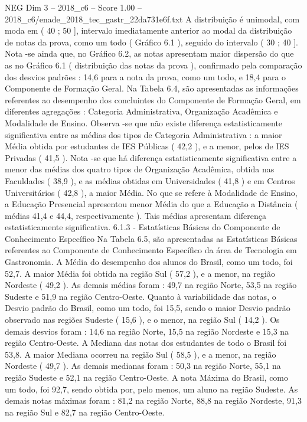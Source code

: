 \begin{textsample}{NEG Dim 3 – 2018\_c6 – Score 1.00 – 2018\_c6/enade\_2018\_tec\_gastr\_22da731e6f.txt}
A distribuição é unimodal, com moda em ( 40 ; 50 ], intervalo imediatamente anterior ao modal da distribuição de notas da prova, como um todo ( Gráfico 6.1 ), seguido do intervalo ( 30 ; 40 ].
Nota -se ainda que, no Gráfico 6.2, as notas apresentam maior dispersão do que as no Gráfico 6.1 ( distribuição das notas da prova ), confirmado pela comparação dos desvios padrões : 14,6 para a nota da prova, como um todo, e 18,4 para o Componente de Formação Geral.
Na Tabela 6.4, são apresentadas as informações referentes ao desempenho dos concluintes do Componente de Formação Geral, em diferentes agregações : Categoria Administrativa, Organização Acadêmica e Modalidade de Ensino.
Observa -se que não existe diferença estatisticamente significativa entre as médias dos tipos de Categoria Administrativa : a maior Média obtida por estudantes de IES Públicas ( 42,2 ), e a menor, pelos de IES Privadas ( 41,5 ).
Nota -se que há diferença estatisticamente significativa entre a menor das médias dos quatro tipos de Organização Acadêmica, obtida nas Faculdades ( 38,9 ), e as médias obtidas em Universidades ( 41,8 ) e em Centros Universitários ( 42,8 ), a maior Média.
No que se refere à Modalidade de Ensino, a Educação Presencial apresentou menor Média do que a Educação a Distância ( médias 41,4 e 44,4, respectivamente ).
Tais médias apresentam diferença estatisticamente significativa. 6.1.3 - Estatísticas Básicas do Componente de Conhecimento Específico Na Tabela 6.5, são apresentadas as Estatísticas Básicas referentes ao Componente de Conhecimento Específico da área de Tecnologia em Gastronomia.
A Média do desempenho dos alunos do Brasil, como um todo, foi 52,7.
A maior Média foi obtida na região Sul ( 57,2 ), e a menor, na região Nordeste ( 49,2 ).
As demais médias foram : 49,7 na região Norte, 53,5 na região Sudeste e 51,9 na região Centro-Oeste.
Quanto à variabilidade das notas, o Desvio padrão do Brasil, como um todo, foi 15,5, sendo o maior Desvio padrão observado nas regiões Sudeste ( 15,6 ), e o menor, na região Sul ( 14,2 ).
Os demais desvios foram : 14,6 na região Norte, 15,5 na região Nordeste e 15,3 na região Centro-Oeste.
A Mediana das notas dos estudantes de todo o Brasil foi 53,8.
A maior Mediana ocorreu na região Sul ( 58,5 ), e a menor, na região Nordeste ( 49,7 ).
As demais medianas foram : 50,3 na região Norte, 55,1 na região Sudeste e 52,1 na região Centro-Oeste.
A nota Máxima do Brasil, como um todo, foi 92,7, sendo obtida por, pelo menos, um aluno na região Sudeste.
As demais notas máximas foram : 81,2 na região Norte, 88,8 na região Nordeste, 91,3 na região Sul e 82,7 na região Centro-Oeste.

\end{textsample}
